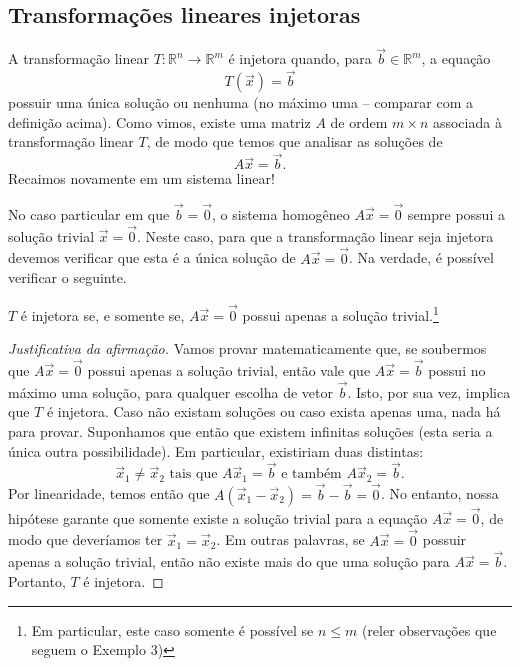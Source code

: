 \subsection{Transformações lineares injetoras}

A transformação linear $T: \mathbb{R}^n \to \mathbb{R}^m$ é injetora quando, para $\vec{b} \in \mathbb{R}^m$, a equação
\begin{equation}
T(\vec{x}) = \vec{b}
\end{equation} possuir uma única solução ou nenhuma (no máximo uma -- comparar com a definição acima). Como vimos, existe uma matriz $A$ de ordem $m\times n$ associada à transformação linear $T$, de modo que temos que analisar as soluções de
\begin{equation}
A\vec{x} = \vec{b}.
\end{equation} Recaimos novamente em um sistema linear!

No caso particular em que $\vec{b} = \vec{0}$, o sistema homogêneo $A\vec{x} = \vec{0}$ sempre possui a solução trivial $\vec{x} = \vec{0}$. Neste caso, para que a transformação linear seja injetora devemos verificar que esta é a única solução de $A\vec{x} = \vec{0}$. Na verdade, é possível verificar o seguinte.



\begin{prop}
  $T$ é injetora se, e somente se, $A\vec{x} = \vec{0}$ possui apenas a solução trivial.\footnote{Em particular, este caso somente é possível se $n \le m$ (reler observações que seguem o Exemplo 3)}
\end{prop}
\begin{proof}[Justificativa da afirmação]
Vamos provar matematicamente que, se soubermos que $A\vec{x} = \vec{0}$ possui apenas a solução trivial, então vale que $A\vec{x} = \vec{b}$ possui no máximo uma solução, para qualquer escolha de vetor $\vec{b}$. Isto, por sua vez, implica que $T$ é injetora. Caso não existam soluções ou caso exista apenas uma, nada há para provar. Suponhamos que então que existem infinitas soluções (esta seria a única outra possibilidade). Em particular, existiriam duas distintas:
\begin{equation}
\vec{x}_1 \neq \vec{x}_2 \text{ tais que } A \vec{x}_1 = \vec{b} \text{ e também } A \vec{x}_2 = \vec{b}.
\end{equation} Por linearidade, temos então que $A (\vec{x}_1 - \vec{x}_2) = \vec{b} - \vec{b} = \vec{0}$. No entanto, nossa hipótese garante que somente existe a solução trivial para a equação $A\vec{x} = \vec{0}$, de modo que deveríamos ter $\vec{x}_1 = \vec{x}_2$. Em outras palavras, se $A\vec{x} = \vec{0}$ possuir apenas a solução trivial, então não existe mais do que uma solução para $A\vec{x} = \vec{b}$. Portanto, $T$ é injetora.
\end{proof}

